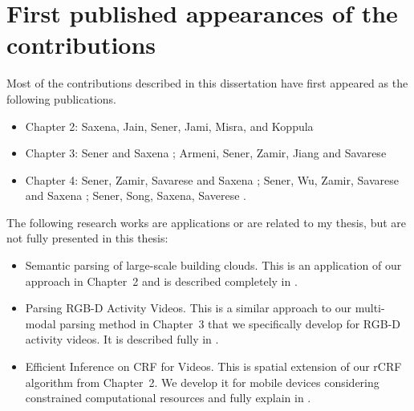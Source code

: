 \section{First published appearances of the contributions}

Most of the contributions described in this dissertation have first appeared as the following publications.
\begin{itemize}
\item Chapter 2: Saxena, Jain, Sener, Jami, Misra, and Koppula \cite{robobrain}
\item Chapter 3: Sener and Saxena \cite{rcrf}; Armeni, Sener, Zamir, Jiang and Savarese \cite{cvpr_iro}
\item Chapter 4: Sener, Zamir, Savarese and Saxena \cite{iccv_ozan}; Sener, Wu, Zamir, Savarese and Saxena \cite{ijcv_ozan}; Sener, Song, Saxena, Saverese \cite{da_ozan}.
\end{itemize}

The following research works are applications or are related to my thesis, but are not fully presented in this thesis:
\begin{itemize}
\item {Semantic parsing of large-scale building clouds.}  This is an application of our approach in Chapter~2 and is described completely in \cite{cvpr_iro}.
\item {Parsing RGB-D Activity Videos.} This is a similar approach to our multi-modal parsing method in Chapter~3 that we specifically develop for RGB-D activity videos. It is described fully in \cite{wu_pami}.
\item {Efficient Inference on CRF for Videos.} This is spatial extension of our rCRF algorithm from Chapter~2. We develop it for mobile devices considering constrained computational resources and fully explain in \cite{tmm}. 
\end{itemize}
